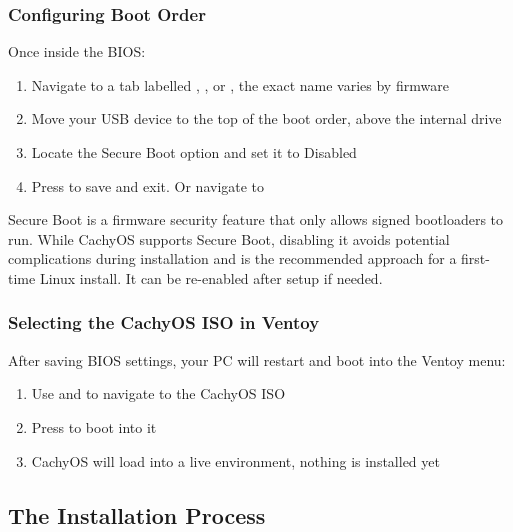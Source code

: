 \documentclass{article}
\begin{document}
\subsubsection{Configuring Boot Order}

Once inside the BIOS:

\begin{enumerate}[leftmargin=1.5em, nosep, label={\arabic*.}]
 \item Navigate to a tab labelled , , or , the exact name varies by firmware
  \item Move your USB device to the top of the boot order, above the internal drive
  \item Locate the Secure Boot option and set it to Disabled
  \item Press  to save and exit. Or navigate to 
\end{enumerate}

\begin{tcolorbox}[arc=12pt, outer arc=10pt,
  colback=red!5!white, colframe=red!60!black,
  title=\textbf{Why Disable Secure Boot?}]
  Secure Boot is a firmware security feature that only allows signed bootloaders to
  run. While CachyOS supports Secure Boot, disabling it avoids potential complications
  during installation and is the recommended approach for a first-time Linux install.
  It can be re-enabled after setup if needed.
\end{tcolorbox}

\subsubsection{Selecting the CachyOS ISO in Ventoy}

After saving BIOS settings, your PC will restart and boot into the Ventoy menu:

\begin{enumerate}[leftmargin=1.5em, nosep, label={\arabic*.}]
  \item Use \keys{\arrowkeyup} and \keys{\arrowkeydown} to navigate to the CachyOS ISO
  \item Press \keys{\return} to boot into it
  \item CachyOS will load into a live environment, nothing is installed yet
\end{enumerate}

\subsection{The Installation Process}
\end{document}
